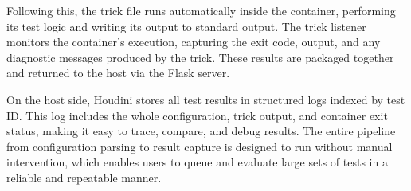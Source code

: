 \begin{doublespace}
Following this, the trick file runs automatically inside the container, performing its test logic and writing its output to standard output. The trick listener monitors the container's execution, capturing the exit code, output, and any diagnostic messages produced by the trick. These results are packaged together and returned to the host via the Flask server.

On the host side, Houdini stores all test results in structured logs indexed by test ID. This log includes the whole configuration, trick output, and container exit status, making it easy to trace, compare, and debug results. The entire pipeline from configuration parsing to result capture is designed to run without manual intervention, which enables users to queue and evaluate large sets of tests in a reliable and repeatable manner.

\end{doublespace}